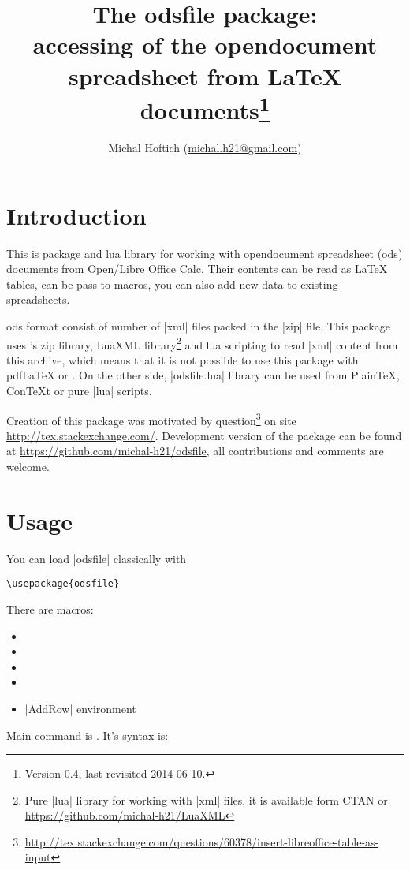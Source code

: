 \documentclass{ltxdoc}
\author{Michal Hoftich (\url{michal.h21@gmail.com})}
\title{The \textsf{odsfile} package:\\
accessing of the \textsf{opendocument spreadsheet} from \LaTeX{}
documents\thanks{Version 0.4, last revisited 2014-06-10.}
}
\newcommand\ods{\textsf{ods}\xspace}
\begin{document}
\maketitle

\tableofcontents

\section{Introduction}

This is \LuaLaTeX{} package and \textsf{lua} library for working with 
\textsf{opendocument spreadsheet} (\ods) documents from Open/Libre Office Calc. 
Their contents can be read as \LaTeX{} tables, can be pass to macros,
 you can also add new data to existing spreadsheets.

\ods format consist of number of |xml| files packed in the |zip| file. 
This package uses \LuaTeX's zip library, LuaXML library\footnote{Pure |lua| library 
for working with |xml| files, it is available form CTAN or \url{https://github.com/michal-h21/LuaXML}} and lua scripting to read |xml| content from this archive, 
which means that it is not possible to use this package with pdf\LaTeX{} or \XeLaTeX. 
On the other side, |odsfile.lua| library can be used from Plain\TeX, 
Con\TeX{}t or pure |lua| scripts.   

Creation of this package was motivated by question\footnote{\url{http://tex.stackexchange.com/questions/60378/insert-libreoffice-table-as-input}} on site \url{http://tex.stackexchange.com/}. Development version of the package can be found at \url{https://github.com/michal-h21/odsfile}, all contributions and comments are welcome. 
\section{Usage}

You can load |odsfile| classically with
\begin{verbatim}
\usepackage{odsfile}
\end{verbatim}
There are macros:
\begin{itemize}
\item {}
\item \cmd{\tabletemplate}
\item \cmd{\loadodsfile}
\item \cmd{\savespreadsheet}
\item |AddRow| environment 
\end{itemize}

\noindent Main command is . It's syntax is:\\ 
\end{document}
